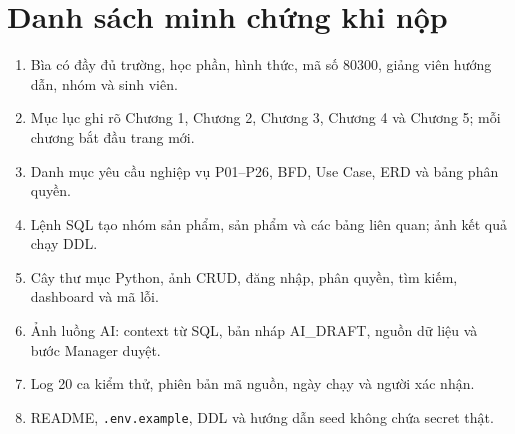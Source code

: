 \section{Danh sách minh chứng khi nộp}

\begin{enumerate}
  \item Bìa có đầy đủ trường, học phần, hình thức, mã số 80300, giảng viên hướng dẫn, nhóm và sinh viên.
  \item Mục lục ghi rõ Chương 1, Chương 2, Chương 3, Chương 4 và Chương 5; mỗi chương bắt đầu trang mới.
  \item Danh mục yêu cầu nghiệp vụ P01--P26, BFD, Use Case, ERD và bảng phân quyền.
  \item Lệnh SQL tạo nhóm sản phẩm, sản phẩm và các bảng liên quan; ảnh kết quả chạy DDL.
  \item Cây thư mục Python, ảnh CRUD, đăng nhập, phân quyền, tìm kiếm, dashboard và mã lỗi.
  \item Ảnh luồng AI: context từ SQL, bản nháp AI\_DRAFT, nguồn dữ liệu và bước Manager duyệt.
  \item Log 20 ca kiểm thử, phiên bản mã nguồn, ngày chạy và người xác nhận.
  \item README, \texttt{.env.example}, DDL và hướng dẫn seed không chứa secret thật.
\end{enumerate}
